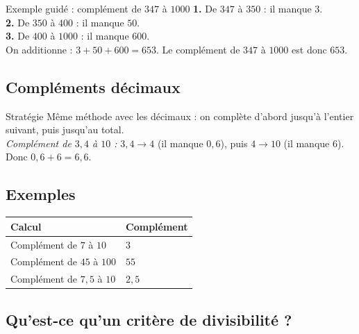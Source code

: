 \vspace{6pt}
\begin{astuce}{Exemple guidé : complément de $347$ à $1000$}
\textbf{1.} De $347$ à $350$ : il manque $3$.\\
\textbf{2.} De $350$ à $400$ : il manque $50$.\\
\textbf{3.} De $400$ à $1000$ : il manque $600$.\\[3pt]
On additionne : $3 + 50 + 600 = 653$. Le complément de $347$ à $1000$ est donc $653$.
\end{astuce}

\subsection{Compléments décimaux}

\begin{astuce}{Stratégie}
Même méthode avec les décimaux : on complète d'abord jusqu'à l'entier suivant, puis jusqu'au total.\\[3pt]
\textit{Complément de $3,4$ à $10$ :} $3,4 \to 4$ (il manque $0,6$), puis $4 \to 10$ (il manque $6$). Donc $0,6 + 6 = 6,6$.
\end{astuce}

\subsection{Exemples}

\def\arraystretch{1.1}
\begin{tabularx}{\linewidth}{|X|X|}
\hline
\cellcolor{themeNO!30}\textbf{Calcul} & \cellcolor{themeNO!30}\textbf{Complément} \\\hline
Complément de $7$ à $10$ & $3$ \\\hline
Complément de $45$ à $100$ & $55$ \\\hline
Complément de $7,5$ à $10$ & $2,5$ \\\hline
\end{tabularx}
\def\arraystretch{1}


\newpage
\semaineinvisible
{} 

\vfill
\subsection{Qu'est-ce qu'un critère de divisibilité ?}

